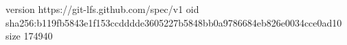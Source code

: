 version https://git-lfs.github.com/spec/v1
oid sha256:b119fb5843e1f153ccdddde3605227b5848bb0a9786684eb826e0034cce0ad10
size 174940
